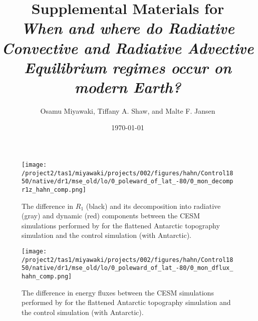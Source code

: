 \documentclass{article}
\title{Supplemental Materials for \\ \textit{When and where do Radiative Convective and Radiative Advective Equilibrium regimes occur on modern Earth?}}
\date{\today}
\author{Osamu Miyawaki, Tiffany A. Shaw, and Malte F. Jansen}
\begin{document}
\maketitle

\begin{figure}[t]
  \noindent\texttt{[image: /project2/tas1/miyawaki/projects/002/figures/hahn/Control1850/native/dr1/mse\_old/lo/0\_poleward\_of\_lat\_-80/0\_mon\_decompr1z\_hahn\_comp.png]}
  \caption{The difference in $R_1$ (black) and its decomposition into radiative (gray) and dynamic (red) components between the CESM simulations performed by \citep{hahn2020} for the flattened Antarctic topography simulation and the control simulation (with Antarctic).}
  \label{fig:hahn-decomp}
\end{figure}

\begin{figure}[t]
  \noindent\texttt{[image: /project2/tas1/miyawaki/projects/002/figures/hahn/Control1850/native/dr1/mse\_old/lo/0\_poleward\_of\_lat\_-80/0\_mon\_dflux\_hahn\_comp.png]}
  \caption{The difference in energy fluxes between the CESM simulations performed by \citep{hahn2020} for the flattened Antarctic topography simulation and the control simulation (with Antarctic).}
  \label{fig:hahn-eflux}
\end{figure}

\clearpage



\end{document}
